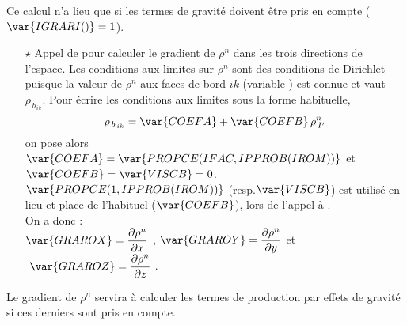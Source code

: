 Ce calcul n'a lieu que si les termes de gravit\'e doivent \^etre pris en compte
($\var{IGRARI()} =1$).
\begin{itemize}
\item [$\star$] Appel de   pour calculer le gradient de $\rho^n$
dans les trois directions de l'espace. Les conditions aux limites sur $\rho^n$
sont des conditions de Dirichlet puisque la valeur de $\rho^n$ aux faces de bord
$ik$ (variable ) est connue et vaut $\rho_{\,b_{\,ik}}$. Pour \'ecrire les conditions aux limites
sous la forme habituelle, $$\rho_{\,b_{\,ik}} = \var{COEFA} + \var{COEFB}
\,\rho^n_{\,I'}$$ on pose alors $\var{COEFA}=
\var{PROPCE(IFAC,IPPROB(IROM))}$ et $\var{COEFB} = \var{VISCB} = 0$.\\
$\var{PROPCE(1,IPPROB(IROM))}$ (resp.$\var{VISCB}$) est utilis\'e en lieu
et place de l'habituel  ($\var{COEFB}$), lors de l'appel \`a .\\
On a donc :\\
$\displaystyle \var{GRAROX}= \frac{\partial \rho^n}{\partial x}\ $,$\displaystyle \ \var{GRAROY}= \frac{\partial
\rho^n}{\partial y}$ et $
\displaystyle \ \var{GRAROZ}= \frac{\partial \rho^n}{\partial z}\ $.

\end{itemize}

Le gradient de $\rho^n$ servira \`a calculer les termes de production par effets de gravit\'e si ces derniers sont pris en compte.

